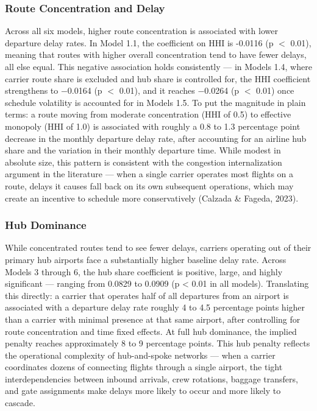 \documentclass[preprint,12pt,authoryear]{elsarticle}
\begin{document}
\subsubsection{Route Concentration and Delay}

Across all six models, higher route concentration is associated with lower departure delay rates. In Model 1.1, the coefficient on HHI is -0.0116 (p $<$ 0.01), meaning that routes with higher overall concentration tend to have fewer delays, all else equal. This negative association holds consistently --- in Models 1.4, where carrier route share is excluded and hub share is controlled for, the HHI coefficient strengthens to −0.0164 (p $<$ 0.01), and it reaches −0.0264 (p $<$ 0.01) once schedule volatility is accounted for in Models 1.5. To put the magnitude in plain terms: a route moving from moderate concentration (HHI of 0.5) to effective monopoly (HHI of 1.0) is associated with roughly a 0.8 to 1.3 percentage point decrease in the monthly departure delay rate, after accounting for an airline hub share and the variation in their monthly departure time. While modest in absolute size, this pattern is consistent with the congestion internalization argument in the literature --- when a single carrier operates most flights on a route, delays it causes fall back on its own subsequent operations, which may create an incentive to schedule more conservatively (Calzada \& Fageda, 2023).

\subsubsection{Hub Dominance}

While concentrated routes tend to see fewer delays, carriers operating out of their primary hub airports face a substantially higher baseline delay rate. Across Models 3 through 6, the hub share coefficient is positive, large, and highly significant — ranging from 0.0829 to 0.0909 (p < 0.01 in all models). Translating this directly: a carrier that operates half of all departures from an airport is associated with a departure delay rate roughly 4 to 4.5 percentage points higher than a carrier with minimal presence at that same airport, after controlling for route concentration and time fixed effects. At full hub dominance, the implied penalty reaches approximately 8 to 9 percentage points. This hub penalty reflects the operational complexity of hub-and-spoke networks — when a carrier coordinates dozens of connecting flights through a single airport, the tight interdependencies between inbound arrivals, crew rotations, baggage transfers, and gate assignments make delays more likely to occur and more likely to cascade.
\end{document}
